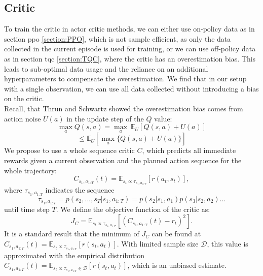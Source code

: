 \subsection{Critic}
\label{sec:AC_Critic}
To train the critic in actor critic methods, we can either use on-policy data as in section \ac{ppo} \ref{section:PPO}, which is not sample efficient, as only the data collected 
in the current episode is used for training, or we can use off-policy data as in section \ac{tqc} \ref{section:TQC}, where the critic has an overestimation bias. This 
leads to sub-optimal data usage and the reliance on an additional hyperparameters to compensate the overestimation. We find that in our setup with a single observation, we can use all data 
collected without introducing a bias on the critic. \\
Recall, that Thrun and Schwartz \cite{thrun1993issues} showed the overestimation bias comes from action noise $U(a)$ in the update step of the $Q$ value:
\begin{equation*}
    \max_{a}Q(s,a) = \max_{a}\ \mathbb{E}_U \left[Q(s,a) + U(a)\right]
\end{equation*}
\begin{equation}
    \leq \mathbb{E}_U \left[\max_a \{Q(s,a) + U(a)\}\right]
\end{equation}
We propose to use a whole sequence critic $C$, which predicts all immediate rewards given a current observation 
and the planned action sequence for the whole trajectory:
\begin{equation}
    \label{eq:emp_mean_c}
    C_{s_1, a_{1:T}}(t) = \mathbb{E}_{s_t \propto \tau_{s_1, a_{1:T}}}\left[r(a_t, s_t)\right],
\end{equation}
where $\tau_{s_1, a_{1:T}}$ indicates the sequence 
$$\tau_{s_1, a_{1:T}} = p(s_2, ..., s_T|s_1, a_{1:T}) = p(s_2|s_1, a_1) p(s_3|s_2,a_2)...$$
 until time step $T$. 
We define the objective function of the critic as:
\begin{equation}
    J_C = \mathbb{E}_{s_t \propto \tau_{s_1, a_{1:T}}}\left[(C_{s_1, a_{1:T}}(t) - r_t)^2\right].
\end{equation}
It is a standard result that the minimum of $J_C$ can be found at $C_{s_1, a_{1:T}}(t) = \mathbb{E}_{s_t \propto \tau_{s_1, a_{1:T}}}\left[r(s_t, a_t)\right]$. 
With limited sample size $\mathcal{D}$, this value is approximated with the empirical distribution $C_{s_1, a_{1:T}}(t) = \mathbb{E}_{s_t \propto \tau_{s_1, a_{1:T}} \in \mathcal{D}}\left[r(s_t, a_t)\right]$, 
which is an unbiased estimate.\\

